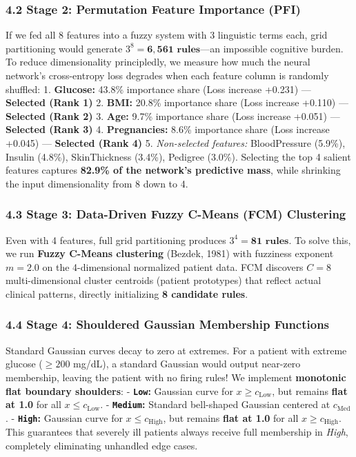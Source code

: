 \subsubsection{4.2 Stage 2: Permutation Feature Importance
(PFI)}\label{stage-2-permutation-feature-importance-pfi}

If we fed all 8 features into a fuzzy system with 3 linguistic terms
each, grid partitioning would generate
\(3^8 = \mathbf{6{,}561 \text{ rules}}\)---an impossible cognitive
burden. To reduce dimensionality principledly, we measure how much the
neural network's cross-entropy loss degrades when each feature column is
randomly shuffled: 1. \textbf{Glucose:} 43.8\% importance share (Loss
increase +0.231) --- \textbf{Selected (Rank 1)} 2. \textbf{BMI:} 20.8\%
importance share (Loss increase +0.110) --- \textbf{Selected (Rank 2)}
3. \textbf{Age:} 9.7\% importance share (Loss increase +0.051) ---
\textbf{Selected (Rank 3)} 4. \textbf{Pregnancies:} 8.6\% importance
share (Loss increase +0.045) --- \textbf{Selected (Rank 4)} 5.
\emph{Non-selected features:} BloodPressure (5.9\%), Insulin (4.8\%),
SkinThickness (3.4\%), Pedigree (3.0\%). Selecting the top 4 salient
features captures \textbf{82.9\% of the network's predictive mass},
while shrinking the input dimensionality from 8 down to 4.

\subsubsection{4.3 Stage 3: Data-Driven Fuzzy C-Means (FCM)
Clustering}\label{stage-3-data-driven-fuzzy-c-means-fcm-clustering}

Even with 4 features, full grid partitioning produces
\(3^4 = \mathbf{81 \text{ rules}}\). To solve this, we run \textbf{Fuzzy
C-Means clustering} (Bezdek, 1981) with fuzziness exponent \(m=2.0\) on
the 4-dimensional normalized patient data. FCM discovers \(C=8\)
multi-dimensional cluster centroids (patient prototypes) that reflect
actual clinical patterns, directly initializing \textbf{8 candidate
rules}.

\subsubsection{4.4 Stage 4: Shouldered Gaussian Membership
Functions}\label{stage-4-shouldered-gaussian-membership-functions}

Standard Gaussian curves decay to zero at extremes. For a patient with
extreme glucose (\(\ge 200\) mg/dL), a standard Gaussian would output
near-zero membership, leaving the patient with no firing rules! We
implement \textbf{monotonic flat boundary shoulders}: -
\textbf{\texttt{Low}:} Gaussian curve for \(x \ge c_{\text{Low}}\), but
remains \textbf{flat at 1.0} for all \(x \le c_{\text{Low}}\). -
\textbf{\texttt{Medium}:} Standard bell-shaped Gaussian centered at
\(c_{\text{Med}}\). - \textbf{\texttt{High}:} Gaussian curve for
\(x \le c_{\text{High}}\), but remains \textbf{flat at 1.0} for all
\(x \ge c_{\text{High}}\). This guarantees that severely ill patients
always receive full membership in \emph{High}, completely eliminating
unhandled edge cases.

